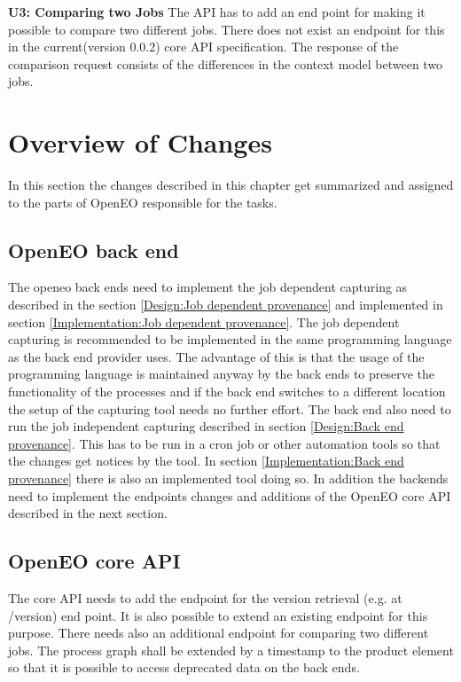 \documentclass[draft,final]{vutinfth} %
\begin{document}
\textbf{U3: Comparing two Jobs}
The API has to add an end point for making it possible to compare two different jobs. There does not exist an endpoint for this in the current(version 0.0.2) core API specification. The response of the comparison request consists of the differences in the context model between two jobs. 


\section{Overview of Changes}\label{Design:Overview of Changes}
In this section the changes described in this chapter get summarized and assigned to the parts of OpenEO responsible for the tasks.
\subsection{OpenEO back end}\label{Design:OpenEO back end}
The openeo back ends need to implement the job dependent capturing as described in the section \ref{Design:Job dependent provenance} and implemented in section \ref{Implementation:Job dependent provenance}. The job dependent capturing is recommended to be implemented in the same programming language as the back end provider uses. The advantage of this is that the usage of the programming language is maintained anyway by the back ends to preserve the functionality of the processes and if the back end switches to a different location the setup of the capturing tool needs no further effort. 
The back end also need to run the job independent capturing described in section \ref{Design:Back end provenance}. This has to be run in a cron job or other automation tools so that the changes get notices by the tool. In section \ref{Implementation:Back end provenance} there is also an implemented tool doing so. 
In addition the backends need to implement the endpoints changes and additions of the OpenEO core API described in the next section.
\subsection{OpenEO core API}\label{Design:OpenEO core API}
The core API needs to add the endpoint for the version retrieval (e.g. at /version) end point. It is also possible to extend an existing endpoint for this purpose. 
There needs also an additional endpoint for comparing two different jobs. 
The process graph shall be extended by a timestamp to the product element so that it is possible to access deprecated data on the back ends.
\end{document}
